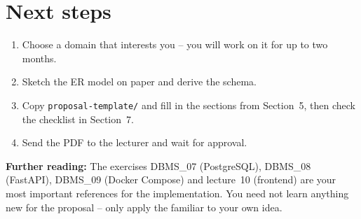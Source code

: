\documentclass[11pt,a4paper]{article}
\begin{document}
\section{Next steps}

\begin{enumerate}[leftmargin=1.6em]
  \item Choose a domain that interests you -- you will work on it for up to two
        months.
  \item Sketch the ER model on paper and derive the schema.
  \item Copy \texttt{proposal-template/} and fill in the sections from
        Section~5, then check the checklist in Section~7.
  \item Send the PDF to the lecturer and wait for approval.
\end{enumerate}

\vspace{1em}
\begin{infobox}
\textbf{Further reading:} The exercises DBMS\_07 (PostgreSQL), DBMS\_08
(FastAPI), DBMS\_09 (Docker Compose) and lecture~10 (frontend) are your most
important references for the implementation. You need not learn anything new for
the proposal -- only apply the familiar to your own idea.
\end{infobox}
\end{document}
